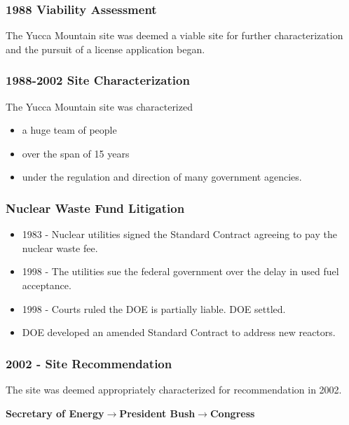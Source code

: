 
\begin{frame}[ctb!]
    \frametitle{1988 Viability Assessment}
    The Yucca Mountain site was deemed a viable site for further 
    characterization and the pursuit of a license application began. 

  \end{frame}

\begin{frame}[ctb!]
    \frametitle{1988-2002 Site Characterization}
    The Yucca Mountain site was characterized 
    \begin{itemize}
      \item a huge team of people 
      \item over the span of 15 years
      \item under the regulation and direction of many government agencies.
    \end{itemize}
  \end{frame}

\begin{frame}[ctb!]
\frametitle{Nuclear Waste Fund Litigation}
    \begin{itemize}
    \item 1983 - Nuclear utilities signed the Standard Contract agreeing to pay the nuclear waste fee.
    \item 1998 - The utilities sue the federal government over the delay in used fuel acceptance.
    \item 1998 - Courts ruled the DOE is partially liable. DOE settled. 
    \item DOE developed an amended Standard Contract \cite{doe_standard_????} to 
      address new reactors.
  \end{itemize}
\end{frame}

\begin{frame}[ctb!]
    \frametitle{2002 - Site Recommendation}
    The site was deemed appropriately characterized for recommendation in 2002.

    \vspace{1cm}
      \textbf{Secretary of Energy}$\longrightarrow$\textbf{President 
      Bush}$\longrightarrow$\textbf{Congress}
  \end{frame}


